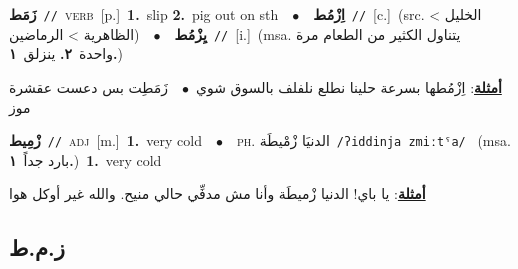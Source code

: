 \documentclass[10pt,a4paper,twoside]{article} %
\begin{document}
\begin{multicols}{2}
{\setlength\topsep{0pt}\textbf{\foreignlanguage{arabic}{زَمَط}}\ {\color{gray}\texttt{//}\color{black}}\ \textsc{verb}\ [p.]\ \textbf{1.}~slip  \textbf{2.}~pig out on sth\ \ $\bullet$\ \ \setlength\topsep{0pt}\textbf{\foreignlanguage{arabic}{اِزْمُط}}\ {\color{gray}\texttt{//}\color{black}}\ [c.]\ (src. \color{gray}\foreignlanguage{arabic}{الخليل > الظاهرية > الرماضين}\color{black})\ \ $\bullet$\ \ \setlength\topsep{0pt}\textbf{\foreignlanguage{arabic}{يِزْمُط}}\ {\color{gray}\texttt{//}\color{black}}\ [i.]\ \color{gray}(msa. \foreignlanguage{arabic}{يتناول الكثير من الطعام مرة واحدة}~\foreignlanguage{arabic}{\textbf{٢.}}  \foreignlanguage{arabic}{ينزلق}~\foreignlanguage{arabic}{\textbf{١.}})\color{black}\  \begin{flushright}\color{gray}\foreignlanguage{arabic}{\textbf{\underline{\foreignlanguage{arabic}{أمثلة}}}: اِزْمُطها بسرعة حلينا نطلع نلفلف بالسوق شوي\ $\bullet$\ \  زَمَطِت بس دعست عقشرة موز}\end{flushright}\color{black}} \vspace{2mm}

{\setlength\topsep{0pt}\textbf{\foreignlanguage{arabic}{زْمِيط}}\ {\color{gray}\texttt{//}\color{black}}\ \textsc{adj}\ [m.]\ \textbf{1.}~very cold\ \ $\bullet$\ \ \textsc{ph.} \color{gray} \foreignlanguage{arabic}{الدنيَا زْمْيطَة}\color{black}\ {\color{gray}\texttt{/{\sffamily ʔiddinja zmiːtˤa}/}\color{black}}\ \color{gray} (msa. \foreignlanguage{arabic}{بارد جداً}~\foreignlanguage{arabic}{\textbf{١.}})\color{black}\ \textbf{1.}~very cold\  \begin{flushright}\color{gray}\foreignlanguage{arabic}{\textbf{\underline{\foreignlanguage{arabic}{أمثلة}}}: يا باي! الدنيا زْميطَة وأنا مش مدفِّي حالي منيح. والله غير أوكل هوا}\end{flushright}\color{black}} \vspace{2mm}

\vspace{-3mm}
\subsection*{\color{blue}\foreignlanguage{arabic}{ز.م.ط}\color{blue}{ (ntws)}} 


\end{multicols}
\end{document}
